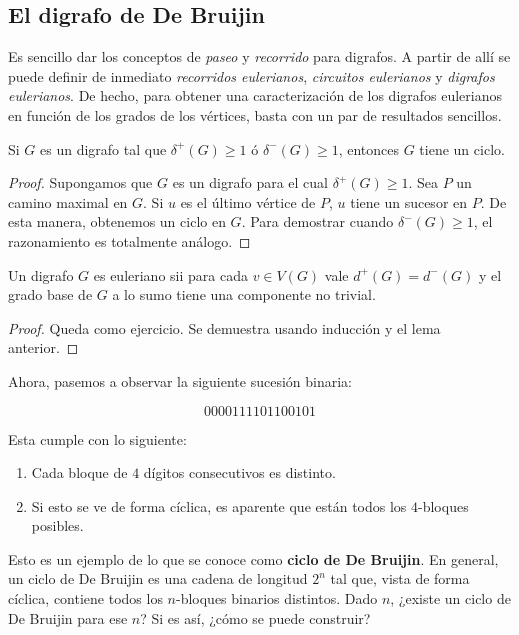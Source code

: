 \subsection{El digrafo de De Bruijin}

Es sencillo dar los conceptos de \textit{paseo} y \textit{recorrido} para digrafos. A partir de allí se puede definir de inmediato \textit{recorridos eulerianos}, \textit{circuitos eulerianos} y \textit{digrafos eulerianos}. De hecho, para obtener una caracterización de los digrafos eulerianos en función de los grados de los vértices, basta con un par de resultados sencillos.

\begin{lem}
    Si $G$ es un digrafo tal que $\delta^+(G) \geq 1$ ó $\delta^-(G) \geq 1$, entonces $G$ tiene un ciclo.
\end{lem}

\begin{proof}
    Supongamos que $G$ es un digrafo para el cual $\delta^+(G) \geq 1$. Sea $P$ un camino maximal en $G$. Si $u$ es el último vértice de $P$, $u$ tiene un sucesor en $P$. De esta manera, obtenemos un ciclo en $G$. Para demostrar cuando $\delta^-(G) \geq 1$, el razonamiento es totalmente análogo.
\end{proof}

\begin{teo}
    Un digrafo $G$ es euleriano sii para cada $v \in V(G)$ vale $d^+(G) = d^-(G)$ y el grado base de $G$ a lo sumo tiene una componente no trivial.
\end{teo}

\begin{proof}
    Queda como ejercicio. Se demuestra usando inducción y el lema anterior.
\end{proof}

Ahora, pasemos a observar la siguiente sucesión binaria:

\[
0000111101100101
\]

Esta cumple con lo siguiente:

\begin{enumerate}
    \item Cada bloque de $4$ dígitos consecutivos es distinto.
    \item Si esto se ve de forma cíclica, es aparente que están todos los $4$-bloques posibles.
\end{enumerate}

Esto es un ejemplo de lo que se conoce como \textbf{ciclo de De Bruijin}. En general, un ciclo de De Bruijin es una cadena de longitud $2^n$ tal que, vista de forma cíclica, contiene todos los $n$-bloques binarios distintos. Dado $n$, ¿existe un ciclo de De Bruijin para ese $n$? Si es así, ¿cómo se puede construir?

